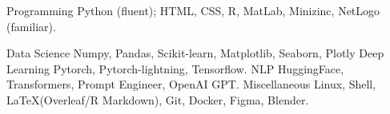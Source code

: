 

\begin{cvskills}

  \cvskill
    {Programming} %
    {Python (fluent); HTML, CSS, R, MatLab, Minizinc, NetLogo (familiar).} %

  \cvskill
    {Data Science} %
    {Numpy, Pandas, Scikit-learn, Matplotlib, Seaborn, Plotly} %
  \cvskill
    {Deep Learning} %
    {Pytorch, Pytorch-lightning, Tensorflow.} %
  \cvskill
    {NLP} %
    {HuggingFace, Transformers, Prompt Engineer, OpenAI GPT.} %
  \cvskill
    {Miscellaneous} %
    {Linux, Shell, \LaTeX (Overleaf/R Markdown), Git, Docker, Figma, Blender.} %

\end{cvskills}
